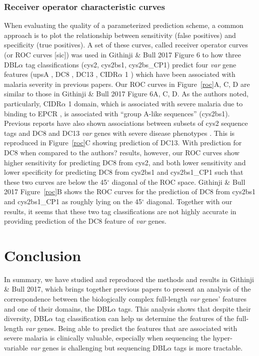 \documentclass[10pt,twocolumn,superscriptaddress]{revtex4-1}
\newcommand{\var}{{\it var}\xspace}
\newcommand{\dbla}{{DBL$\alpha$}\xspace}
\newcommand{\cidra}{{CIDR$\alpha$}\xspace}
\newcommand{\paper}{{Githinji \& Bull 2017}\xspace}
\begin{document}
\subsubsection{Receiver operator characteristic curves}
When evaluating the quality of a parameterized prediction scheme, a common approach is to plot the relationship between sensitivity (false positives) and specificity (true positives). A set of these curves, called receiver operator curves (or ROC curves [sic]) was used in \paper Figure 6 to how three \dbla tag classifications (cys2, cys2bs1, cys2bs\_CP1) predict four \var gene features (upsA \cite{warimwe2012}, DC8 \cite{lavstsen2012} \cite{rask2010}, DC13 \cite{warimwe2012}, \cidra1 \cite{turner2013}) which have been associated with malaria severity in previous papers. Our ROC curves in Figure~\ref{roc}A, C, D are similar to those in \paper Figure 6A, C, D. As the authors noted, particularly, \cidra1 domain, which is associated with severe malaria due to binding to EPCR \cite{turner2013}, is associated with ``group A-like sequences'' (cys2bs1). Previous reports have also shown associations between subsets of cys2 sequence tags and DC8 and DC13 \var genes with severe disease phenotypes \cite{warimwe2012}. This is reproduced in Figure~\ref{roc}C showing prediction of DC13. With prediction for DC8 when compared to the authors? results, however, our ROC curves show higher sensitivity for predicting DC8 from cys2, and both lower sensitivity and lower specificity for predicting DC8 from cys2bs1 and cys2bs1\_CP1 such that these two curves are below the 45$^{\circ}$ diagonal of the ROC space. \paper Figure~\ref{roc}B shows the ROC curves for the prediction of DC8 from cys2bs1 and cys2bs1\_CP1 as roughly lying on the 45$^{\circ}$ diagonal. Together with our results, it seems that these two tag classifications are not highly accurate in providing prediction of the DC8 feature of \var genes. 




\section{Conclusion}
In summary, we have studied and reproduced the methods and results in \paper, which brings together previous papers to present an analysis of the correspondence between the biologically complex full-length \var genes' features and one of their domains, the \dbla tags. This analysis shows that despite their diversity, \dbla tag classification can help us determine the features of the full-length \var genes. Being able to predict the features that are associated with severe malaria is clinically valuable, especially when sequencing the hyper-variable \var genes is challenging but sequencing \dbla tags is more tractable. 
\end{document}
